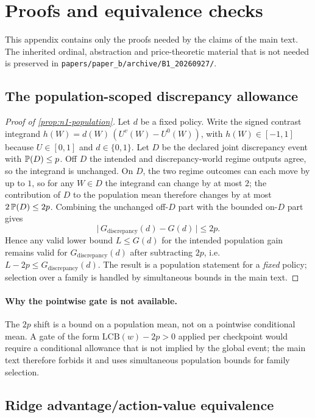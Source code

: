 \section{Proofs and equivalence checks}
\label{app:b-proofs}

This appendix contains only the proofs needed by the claims of the main text.
The inherited ordinal, abstraction and price-theoretic material that is not
needed is preserved in \texttt{papers/paper\_b/archive/B1\_20260927/}.

\subsection{The population-scoped discrepancy allowance}

\begin{proof}[Proof of \cref{prop:n1-population}]
Let $d$ be a fixed policy.  Write the signed contrast integrand
$h(W)=d(W)\,(U^v(W)-U^0(W))$, with $h(W)\in[-1,1]$ because $U\in[0,1]$ and
$d\in\{0,1\}$.  Let $D$ be the declared joint discrepancy event with
$\mathbb{P}(D)\le p$.  Off $D$ the intended and discrepancy-world regime outputs agree,
so the integrand is unchanged.  On $D$, the two regime outcomes can each move by
up to $1$, so for any $W\in D$ the integrand can change by at most $2$; the
contribution of $D$ to the population mean therefore changes by at most
$2\,\mathbb{P}(D)\le 2p$.  Combining the unchanged off-$D$ part with the bounded on-$D$
part gives
\[
 \big|\,G_{\text{discrepancy}}(d)-G(d)\,\big|\le 2p .
\]
Hence any valid lower bound $L\le G(d)$ for the intended population gain remains
valid for $G_{\text{discrepancy}}(d)$ after subtracting $2p$, i.e.\
$L-2p\le G_{\text{discrepancy}}(d)$.  The result is a population statement for a
\emph{fixed} policy; selection over a family is handled by simultaneous bounds in
the main text.
\end{proof}

\paragraph{Why the pointwise gate is not available.}
The $2p$ shift is a bound on a population mean, not on a pointwise conditional
mean.  A gate of the form $\mathrm{LCB}(w)-2p>0$ applied per checkpoint would
require a conditional allowance that is not implied by the global event; the
main text therefore forbids it and uses simultaneous population bounds for
family selection.

\subsection{Ridge advantage/action-value equivalence}
\label{app:b-ridge}

